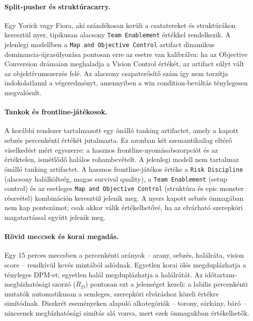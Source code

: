 ﻿\documentclass[a4paper,12pt]{report}
\begin{document}
\paragraph{Split-pusher és struktúracarry.}
Egy Yorick vagy Fiora, aki szándékosan kerüli a csatatereket és struktúrákon keresztül nyer, tipikusan alacsony \texttt{Team Enablement} értékkel rendelkezik. A jelenlegi modellben a \texttt{Map and Objective Control} artifact dinamikus dominancia-újrasúlyozása pontosan erre az esetre van kalibrálva: ha az Objective Conversion drámaian meghaladja a Vision Control értékét, az artifact súlyt vált az objektívumszerzés felé. Az alacsony csapaterősítő szám így nem torzítja indokolatlanul a végeredményt, amennyiben a win condition-beváltás ténylegesen megvalósult.

\paragraph{Tankok és frontline-játékosok.}
A korábbi rendszer tartalmazott egy önálló tanking artifactet, amely a kapott sebzés percenkénti értékét jutalmazta. Ez azonban két szemantikailag eltérő viselkedést mért egyszerre: a hasznos frontline-nyomásabszorpciót és az értéktelen, ismétlődő halálos rohambevételt. A jelenlegi modell nem tartalmaz önálló tanking artifactet. A hasznos frontline-játékos értéke a \texttt{Risk Discipline} (alacsony halálköltség, magas survival quality), a \texttt{Team Enablement} (setup control) és az esetleges \texttt{Map and Objective Control} (struktúra és epic monster részvétel) kombináción keresztül jelenik meg. A nyers kapott sebzés önmagában nem kap pontszámot; csak akkor válik értékelhetővé, ha az elvárható szerepköri magatartással együtt jelenik meg.

\paragraph{Rövid meccsek és korai megadás.}
Egy 15 perces meccsben a percenkénti arányok -- arany, sebzés, halálráta, vision score -- rendkívül kevés mintából adódnak. Egyetlen korai ölés megduplázhatja a tényleges DPM-et; egyetlen halál megduplázhatja a halálrátát. Az időtartam-megbízhatósági szorzó ($R_D$) pontosan ezt a jelenséget kezeli: a labilis percenkénti mutatók automatikusan a semleges, szerepköri elváráshoz közeli értékre simítódnak. Diszkrét eseményeken alapuló alkategóriák -- torony, sárkány, báró -- nincsenek megbízhatósági simítás alá vonva, mert ezek önmagukban értékelhetők.
\end{document}

